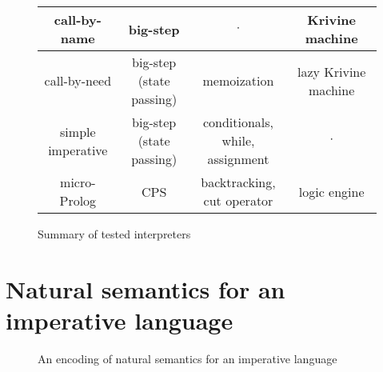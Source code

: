 \begin{figure}
\begin{center}
\begin{tabular}{c|c|c|c}
  \hline
  \makecell{call-by-name \\ \LC{}} & big-step & $\cdot$ & Krivine machine \\
  \hline
  \makecell{call-by-need \\ \LC{}} & \makecell{big-step \\ (state passing)} & memoization & lazy Krivine machine \\
  \hline
  \makecell{simple \\ imperative} & \makecell{big-step \\ (state passing)} & \makecell{conditionals, \\ while, assignment} & $\cdot$\\
  \hline
  micro-Prolog & CPS & \makecell{backtracking, \\ cut operator} & logic engine\\
  \hline
  \end{tabular}
  \end{center}
  \caption{Summary of tested interpreters}\label{fig:tested-interpreters}
  \end{figure}

\section{Natural semantics for an imperative language}
\begin{figure}
  
  \caption{An encoding of natural semantics for an imperative language}
  \label{fig:studies-imp}
\end{figure}

